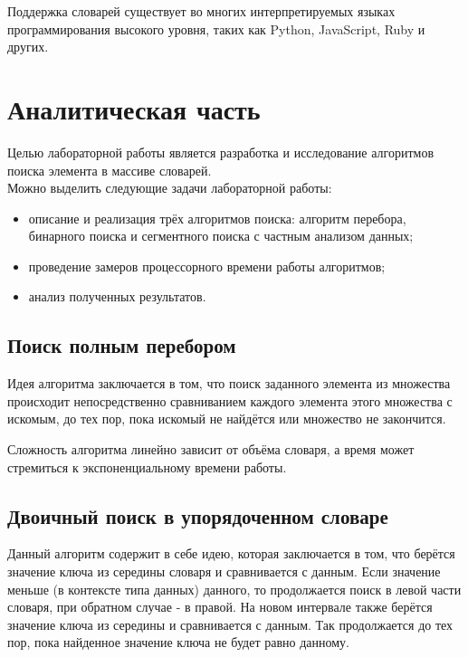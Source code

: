 \documentclass[12pt,a4paper]{report}
\begin{document}
Поддержка словарей существует во многих интерпретируемых языках программирования высокого уровня, таких как Python, 
JavaScript, Ruby и других.

\newpage
\chapter{Аналитическая часть}

Целью лабораторной работы является разработка и исследование алгоритмов поиска элемента в массиве словарей.\\

Можно выделить следующие задачи лабораторной работы:
\begin{itemize}
    \item описание и реализация трёх алгоритмов поиска: алгоритм перебора, бинарного поиска и сегментного 
    поиска с частным анализом данных;
    \item проведение замеров процессорного времени работы алгоритмов;
    \item анализ полученных результатов.
\end{itemize}

\section{Поиск полным перебором}

Идея алгоритма заключается в том, что поиск заданного элемента из множества происходит непосредственно 
сравниванием каждого элемента этого множества с искомым, до тех пор, пока искомый не найдётся или множество
не закончится. 

Сложность алгоритма линейно зависит от объёма словаря, а время может стремиться к экспоненциальному времени 
работы.  

\section{Двоичный поиск в упорядоченном словаре}

Данный алгоритм содержит в себе идею, которая заключается в том, что берётся значение ключа из середины словаря и 
сравнивается с данным. 
Если значение меньше (в контексте типа данных) данного, то продолжается поиск в левой части словаря, при обратном случае - в правой. 
На новом интервале также берётся значение ключа из середины и сравнивается с данным. 
Так продолжается до тех пор, пока найденное значение ключа не будет равно данному\cite{analyse_info}.
\end{document}

